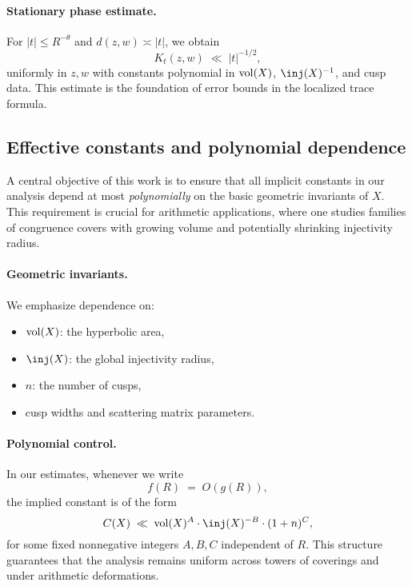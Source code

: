 \paragraph{Stationary phase estimate.}
For $|t|\le R^{-\theta}$ and $d(z,w)\asymp |t|$, we obtain
\begin{equation}\label{eq:stationary-phase}
  K_t(z,w) \;\ll\; |t|^{-1/2},
\end{equation}
uniformly in $z,w$ with constants polynomial in $\operatorname{vol}(X)$, $\inj(X)^{-1}$, and cusp data.  
This estimate is the foundation of error bounds in the localized trace formula.

\subsection{Effective constants and polynomial dependence}\label{subsec:constants}

A central objective of this work is to ensure that all implicit constants 
in our analysis depend at most \emph{polynomially} on the basic geometric invariants of $X$.
This requirement is crucial for arithmetic applications, where one studies 
families of congruence covers with growing volume and potentially shrinking injectivity radius.  

\paragraph{Geometric invariants.}  
We emphasize dependence on:
\begin{itemize}
  \item $\operatorname{vol}(X)$: the hyperbolic area,
  \item $\inj(X)$: the global injectivity radius,
  \item $n$: the number of cusps,
  \item cusp widths and scattering matrix parameters.
\end{itemize}

\paragraph{Polynomial control.}
In our estimates, whenever we write
\[
  f(R) \;=\; O(g(R)),
\]
the implied constant is of the form
\[
  C(X) \;\ll\; \vol(X)^A \cdot \inj(X)^{-B} \cdot (1+n)^C,
\]
for some fixed nonnegative integers $A,B,C$ independent of $R$.  
This structure guarantees that the analysis remains uniform across towers of coverings
and under arithmetic deformations.

